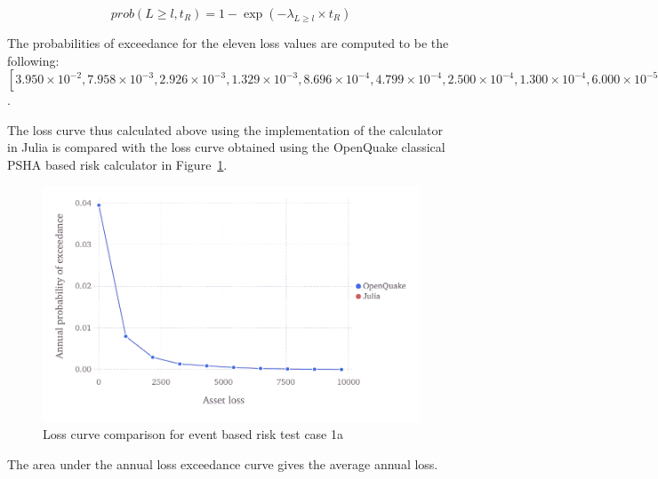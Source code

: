\begin{equation}
	prob(L \geq l, t_R) = 1 - \exp (-\lambda_{L \geq l} \times t_R)
\end{equation}

The probabilities of exceedance for the eleven loss values are computed to be the following: $[3.950\times10^{-2}, 7.958\times10^{-3}, 2.926\times10^{-3}, 1.329\times10^{-3}, 8.696\times10^{-4}, 4.799\times10^{-4}, 2.500\times10^{-4}, 1.300\times10^{-4}, 6.000\times10^{-5}, 0.000]$.

The loss curve thus calculated above using the implementation of the calculator in Julia is compared with the loss curve obtained using the OpenQuake classical PSHA based risk calculator in Figure~\ref{fig:lc-ebr-1a}.

\begin{figure}[htbp]
\centering
\includegraphics[width=12cm]{qareport/figures/fig-lc-ebr-1a}
\caption{Loss curve comparison for event based risk test case 1a}
\label{fig:lc-ebr-1a}
\end{figure}

The area under the annual loss exceedance curve gives the average annual loss.